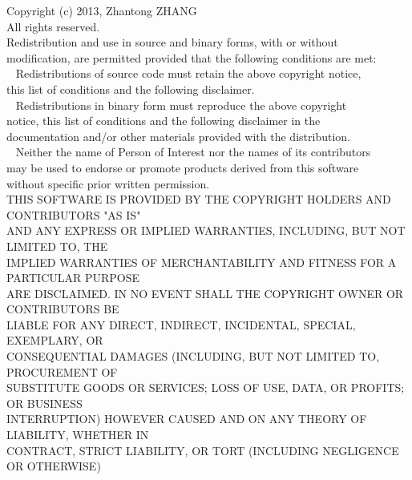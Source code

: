 {\ttfamily\raggedright
Copyright (c) 2013, Zhantong ZHANG \\
All rights reserved. \\
\vspace{1\baselineskip}\vspace{-\parskip}
Redistribution and use in source and binary forms, with or without \\
modification, are permitted provided that the following conditions are met: \\
\vspace{1\baselineskip}\vspace{-\parskip}
\ \* Redistributions of source code must retain the above copyright notice, \\
   this list of conditions and the following disclaimer. \\
\ \* Redistributions in binary form must reproduce the above copyright \\
   notice, this list of conditions and the following disclaimer in the \\
   documentation and/or other materials provided with the distribution. \\
\ \* Neither the name of Person of Interest nor the names of its contributors \\
   may be used to endorse or promote products derived from this software \\
   without specific prior written permission. \\
\vspace{1\baselineskip}\vspace{-\parskip}
THIS SOFTWARE IS PROVIDED BY THE COPYRIGHT HOLDERS AND CONTRIBUTORS "AS IS" \\
AND ANY EXPRESS OR IMPLIED WARRANTIES, INCLUDING, BUT NOT LIMITED TO, THE \\
IMPLIED WARRANTIES OF MERCHANTABILITY AND FITNESS FOR A PARTICULAR PURPOSE \\
ARE DISCLAIMED. IN NO EVENT SHALL THE COPYRIGHT OWNER OR CONTRIBUTORS BE \\
LIABLE FOR ANY DIRECT, INDIRECT, INCIDENTAL, SPECIAL, EXEMPLARY, OR \\
CONSEQUENTIAL DAMAGES (INCLUDING, BUT NOT LIMITED TO, PROCUREMENT OF \\
SUBSTITUTE GOODS OR SERVICES; LOSS OF USE, DATA, OR PROFITS; OR BUSINESS \\
INTERRUPTION) HOWEVER CAUSED AND ON ANY THEORY OF LIABILITY, WHETHER IN \\
CONTRACT, STRICT LIABILITY, OR TORT (INCLUDING NEGLIGENCE OR OTHERWISE) \\
}
